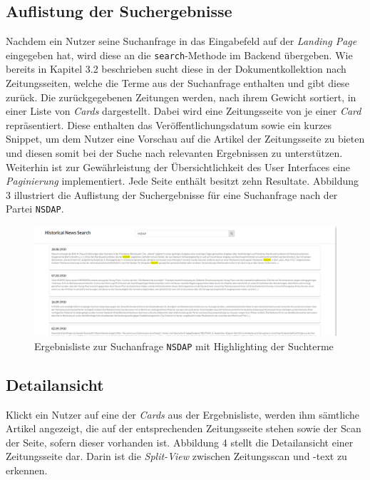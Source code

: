 \documentclass[11pt,a4paper, halfparskip]{scrartcl}
\begin{document}
\subsection{Auflistung der Suchergebnisse}

Nachdem ein Nutzer seine Suchanfrage in das Eingabefeld auf der \textit{Landing Page} eingegeben hat, wird diese an die \texttt{search}-Methode im Backend übergeben.
Wie bereits in Kapitel 3.2 beschrieben sucht diese in der Dokumentkollektion nach Zeitungsseiten, welche die Terme aus der Suchanfrage enthalten und gibt diese zurück. 
Die zurückgegebenen Zeitungen werden, nach ihrem Gewicht sortiert, in einer Liste von \textit{Cards} dargestellt.
Dabei wird eine Zeitungsseite von je einer \textit{Card} repräsentiert.
Diese enthalten das Veröffentlichungsdatum sowie ein kurzes Snippet, um dem Nutzer eine Vorschau auf die Artikel der Zeitungsseite zu bieten und diesen somit bei der Suche nach relevanten Ergebnissen zu unterstützen.
Weiterhin ist zur Gewährleistung der Übersichtlichkeit des User Interfaces eine \textit{Paginierung} implementiert.
Jede Seite enthält besitzt zehn Resultate. 
Abbildung 3 illustriert die Auflistung der Suchergebnisse für eine Suchanfrage nach der Partei \texttt{NSDAP}.

\begin{figure}[h]
	\includegraphics[width=\linewidth]{images/resultlist-view.png}
	\caption{Ergebnisliste zur Suchanfrage \texttt{NSDAP} mit Highlighting der Suchterme}
\end{figure}

\subsection{Detailansicht}

Klickt ein Nutzer auf eine der \textit{Cards} aus der Ergebnisliste, werden ihm sämtliche Artikel angezeigt, die auf der entsprechenden Zeitungsseite stehen sowie der Scan der Seite, sofern dieser vorhanden ist.
Abbildung 4 stellt die Detailansicht einer Zeitungsseite dar.
Darin ist die \textit{Split-View} zwischen Zeitungsscan und -text zu erkennen.
\end{document}
